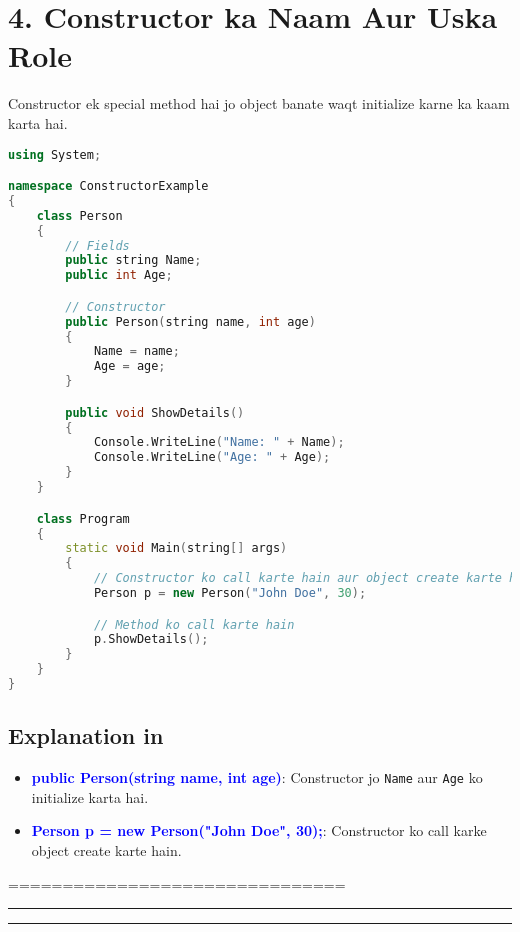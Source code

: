 \documentclass[12pt]{article}
\begin{document}
\section*{\textbf{4. Constructor ka Naam Aur Uska Role}}

Constructor ek special method hai jo object banate waqt initialize karne ka kaam karta hai.

\begin{lstlisting}[language=C++, caption=Constructor in C#]
using System;

namespace ConstructorExample
{
    class Person
    {
        // Fields
        public string Name;
        public int Age;

        // Constructor
        public Person(string name, int age)
        {
            Name = name;
            Age = age;
        }

        public void ShowDetails()
        {
            Console.WriteLine("Name: " + Name);
            Console.WriteLine("Age: " + Age);
        }
    }

    class Program
    {
        static void Main(string[] args)
        {
            // Constructor ko call karte hain aur object create karte hain
            Person p = new Person("John Doe", 30);

            // Method ko call karte hain
            p.ShowDetails();
        }
    }
}
\end{lstlisting}

\subsection*{Explanation in  }

\begin{itemize}
    \item \textbf{\textcolor{blue}{public Person(string name, int age)}}: Constructor jo \texttt{Name} aur \texttt{Age} ko initialize karta hai.
    \item \textbf{\textcolor{blue}{Person p = new Person("John Doe", 30);}}: Constructor ko call karke object create karte hain.
\end{itemize}

===============================
\hrule

\hrule
\end{document}
